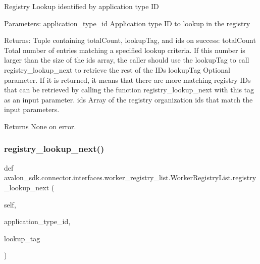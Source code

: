 \begin{DoxyVerb}Registry Lookup identified by application type ID

Parameters:
application_type_id  Application type ID to lookup in the registry

Returns:
Tuple containing totalCount, lookupTag, and ids on success:
totalCount Total number of entries matching a specified lookup
   criteria. If this number is larger than the size of the
   ids array, the caller should use the lookupTag to call
   registry_lookup_next to retrieve the rest of the IDs
lookupTag  Optional parameter. If it is returned, it means that
   there are more matching registry IDs that can be
   retrieved by calling the function registry_lookup_next
   with this tag as an input parameter.
ids        Array of the registry organization ids that match the
   input parameters.

Returns None on error.
\end{DoxyVerb}
 \mbox{\label{classavalon__sdk_1_1connector_1_1interfaces_1_1worker__registry__list_1_1WorkerRegistryList_a3f32539b44fe6d922d486a8ae89cc2d3}} 
\subsubsection{\texorpdfstring{registry\+\_\+lookup\+\_\+next()}{registry\_lookup\_next()}}
{\footnotesize\ttfamily def avalon\+\_\+sdk.\+connector.\+interfaces.\+worker\+\_\+registry\+\_\+list.\+Worker\+Registry\+List.\+registry\+\_\+lookup\+\_\+next (\begin{DoxyParamCaption}\item[{}]{self,  }\item[{}]{application\+\_\+type\+\_\+id,  }\item[{}]{lookup\+\_\+tag }\end{DoxyParamCaption})}

